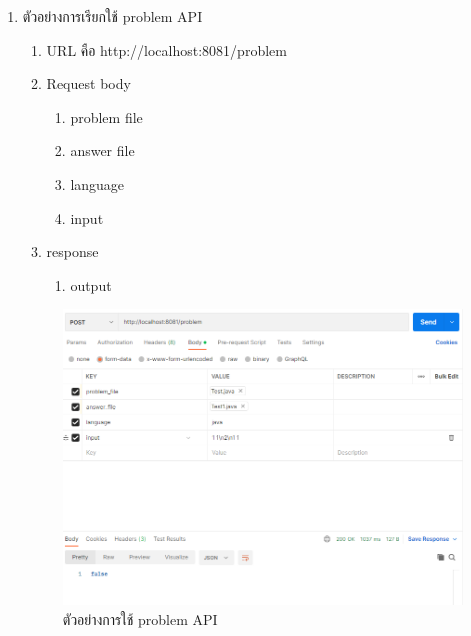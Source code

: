 \begin{enumerate}
    \item ตัวอย่างการเรียกใช้ problem API
    \begin{enumerate}
            \item URL คือ http://localhost:8081/problem
            \item Request body
                \begin{enumerate}
                    \item problem file
                    \item answer file
                    \item language
                    \item input
                \end{enumerate}
            \item response
                \begin{enumerate}
                    \item output
                \end{enumerate}
        \end{enumerate}

    \begin{figure}[H]
            \centering
                \centering
                \includegraphics[width=5in]{latex/figures/problempost.png}
            \caption{ตัวอย่างการใช้ problem API}
    \end{figure}
\end{enumerate}

